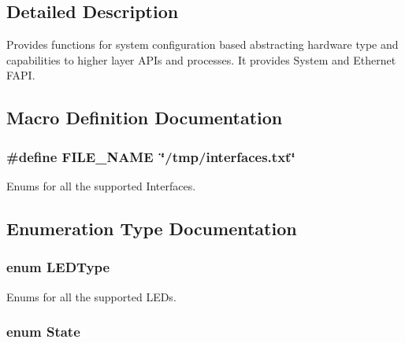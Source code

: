 \subsection{Detailed Description}
Provides functions for system configuration based abstracting hardware type and capabilities to higher layer A\-P\-Is and processes. It provides System and Ethernet F\-A\-P\-I. 

\subsection{Macro Definition Documentation}
\hypertarget{group__FAPI__SYSTEM_gab117546549783a058d0321a287699579}{
\subsubsection[{F\-I\-L\-E\-\_\-\-N\-A\-M\-E}]{\setlength{\rightskip}{0pt plus 5cm}\#define F\-I\-L\-E\-\_\-\-N\-A\-M\-E~\char`\"{}/tmp/interfaces.\-txt\char`\"{}}}\label{group__FAPI__SYSTEM_gab117546549783a058d0321a287699579}


Enums for all the supported Interfaces. 



\subsection{Enumeration Type Documentation}
\hypertarget{group__FAPI__SYSTEM_ga5f99aa5077acffebe451d1268c69db58}{
\subsubsection[{L\-E\-D\-Type}]{\setlength{\rightskip}{0pt plus 5cm}enum {\bf L\-E\-D\-Type}}}\label{group__FAPI__SYSTEM_ga5f99aa5077acffebe451d1268c69db58}


Enums for all the supported L\-E\-Ds. 

\hypertarget{group__FAPI__SYSTEM_ga5d74787dedbc4e11c1ab15bf487e61f8}{
\subsubsection[{State}]{\setlength{\rightskip}{0pt plus 5cm}enum {\bf State}}}\label{group__FAPI__SYSTEM_ga5d74787dedbc4e11c1ab15bf487e61f8}


